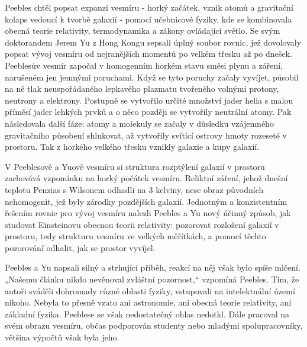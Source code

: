   Peebles chtěl popsat expanzi vesmíru - horký začátek, vznik atomů a gravitační kolaps vedoucí k
  tvorbě galaxií - pomocí učebnicové fyziky, kde se kombinovala obecná teorie relativity,
  termodynamika a zákony ovládající světlo. Se svým doktorandem Jerem Yu z Hong Kongu sepsali úplný
  soubor rovnic, jež dovolovaly popsat vývoj vesmíru od nejranějších momentů po velkém třesku až po
  dnešek. Peeblesův vesmír započal v homogenním horkém stavu směsi plynu a záření, narušeném jen
  jemnými poruchami. Když se tyto poruchy začaly vyvíjet, působil na ně tlak neuspořádaného
  lepkavého plazmatu tvořeného volnými protony, neutrony a elektrony. Postupně se vytvořilo určité
  množství jader helia s malou příměsí jader lehkých prvků a o něco později se vytvořily neutrální
  atomy. Pak následovala další fáze: atomy a molekuly se začaly v důsledku vzájemného gravitačního
  působení shlukovat, až vytvořily svítící ostrovy hmoty rozeseté v prostoru. Tak z horkého velkého
  třesku vznikly galaxie a kupy galaxií. 
  
  V Peeblesově a Yuově vesmíru si struktura rozptýlení galaxií v prostoru zachovává vzpomínku na
  horký počátek vesmíru. Reliktní záření, jehož dnešní teplotu Penzias s Wilsonem odhadli na 3
  kelviny, nese obraz původních nehomogenit, jež byly zárodky pozdějších galaxií. Jednotným a
  konzistentním řešením rovnic pro vývoj vesmíru nalezli Peebles a Yu nový účinný způsob, jak
  studovat Einsteinovu obecnou teorii relativity: pozorovat rozložení galaxií v prostoru, tedy
  strukturu vesmíru ve velkých měřítkách, a pomocí těchto pozorování odhalit, jak se prostor
  vyvíjel.
  
  Peebles a Yu napsali silný a strhující příběh, reakcí na něj však bylo spíše mlčení. „Našemu
  článku nikdo nevěnoval zvláštní pozornost,“ vzpomíná Peebles. Tím, že autoři sváděli dohromady
  různé oblasti fyziky, vstupovali na intelektuální území nikoho. Nebyla to přesně vzato ani
  astronomie, ani obecná teorie relativity, ani základní fyzika. Peeblese se však nedostatečný ohlas
  nedotkl. Dále pracoval na svém obrazu vesmíru, občas podporován studenty nebo mladými
  spolupracovníky, většina výpočtů však byla jeho. 
  
